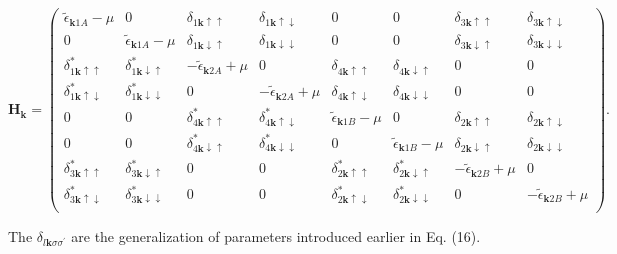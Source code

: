 \documentclass[aps,prb,showpacs,reprint]{revtex4-1}
\begin{document}
\begin{widetext}
\begin{equation}
\mathbf{H}_{\mathbf{k}}=\left(\begin{array}{cccccccc}
\tilde{\epsilon}_{\mathbf{k}1A}-\mu & 0 & \delta_{1\mathbf{k}\uparrow\uparrow} &
\delta_{1\mathbf{k}\uparrow\downarrow} & 0 & 0 &
\delta_{3\mathbf{k}\uparrow\uparrow} & \delta_{3\mathbf{k}\uparrow\downarrow}\\
0 & \tilde{\epsilon}_{\mathbf{k}1A}-\mu & \delta_{1\mathbf{k}\downarrow\uparrow}
&
\delta_{1\mathbf{k}\downarrow\downarrow} & 0 & 0 &
\delta_{3\mathbf{k}\downarrow\uparrow} &
\delta_{3\mathbf{k}\downarrow\downarrow}\\
\delta^*_{1\mathbf{k}\uparrow\uparrow} &
\delta^*_{1\mathbf{k}\downarrow\uparrow} &
-\tilde{\epsilon}_{\mathbf{k}2A}+\mu & 0 & \delta_{4\mathbf{k}\uparrow\uparrow}
&
\delta_{4\mathbf{k}\downarrow\uparrow} & 0 & 0\\
\delta^*_{1\mathbf{k}\uparrow\downarrow} &
\delta^*_{1\mathbf{k}\downarrow\downarrow} & 0 &
-\tilde{\epsilon}_{\mathbf{k}2A}+\mu & \delta_{4\mathbf{k}\uparrow\downarrow} &
\delta_{4\mathbf{k}\downarrow\downarrow} & 0 & 0 \\
0 & 0 & \delta^*_{4\mathbf{k}\uparrow\uparrow} &
\delta^*_{4\mathbf{k}\uparrow\downarrow} &
 \tilde{\epsilon}_{\mathbf{k}1B}-\mu & 0 & \delta_{2\mathbf{k}\uparrow\uparrow}
& \delta_{2\mathbf{k}\uparrow\downarrow} \\
0 & 0 & \delta^*_{4\mathbf{k}\downarrow\uparrow} &
\delta^*_{4\mathbf{k}\downarrow\downarrow} & 0
& \tilde{\epsilon}_{\mathbf{k}1B}-\mu & \delta_{2\mathbf{k}\downarrow\uparrow} &
\delta_{2\mathbf{k}\downarrow\downarrow} \\
\delta^*_{3\mathbf{k}\uparrow\uparrow} &
\delta^*_{3\mathbf{k}\downarrow\uparrow} & 0 & 0 &
\delta^*_{2\mathbf{k}\uparrow\uparrow} &
\delta^*_{2\mathbf{k}\downarrow\uparrow} &
-\tilde{\epsilon}_{\mathbf{k}2B}+\mu & 0\\
\delta^*_{3\mathbf{k}\uparrow\downarrow} &
\delta^*_{3\mathbf{k}\downarrow\downarrow} & 0 &
0 & \delta^*_{2\mathbf{k}\uparrow\downarrow} &
\delta^*_{2\mathbf{k}\downarrow\downarrow} & 0 &
-\tilde{\epsilon}_{\mathbf{k}2B}+\mu\\
\end{array} \right).
\label{eq:matrix_Happ2}
\end{equation}
\end{widetext}
The $\delta_{l\mathbf{k}\sigma\sigma^{\prime}}$ are the
generalization of parameters introduced earlier in Eq. (16). 
\end{document}
